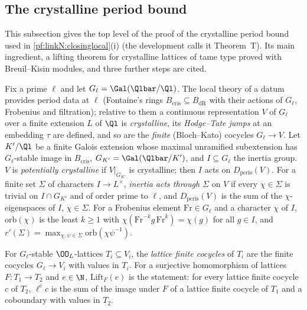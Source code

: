 \subsection{The crystalline period bound}\label{sec:pf:linkN:thmT}

This subsection gives the top level of the proof of the crystalline period bound used in \cref{pf:linkN:closinglocal}(i) (the
development calls it Theorem~T). Its main ingredient, a lifting theorem for crystalline lattices of tame type proved with
Breuil--Kisin modules, and three further steps are cited.

\begin{definition}[Setting]\label{pf:linkN:Tsetting}
Fix a prime $\ell$ and let $G_\ell=\Gal(\Qlbar/\Ql)$. The local theory of a datum provides period data at $\ell$ (Fontaine's rings
$B_{\mathrm{cris}}\subseteq B_{\mathrm{dR}}$ with their actions of $G_\ell$, Frobenius and filtration); relative to them a continuous
representation $V$ of $G_\ell$ over a finite extension $L$ of $\Ql$ is \emph{crystalline}, its \emph{Hodge--Tate jumps} at an embedding $\tau$ are
defined, and so are the \emph{finite} (Bloch--Kato) cocycles $G_\ell\to V$. Let $K'/\Ql$ be a finite Galois extension whose maximal unramified
subextension has $G_\ell$-stable image in $B_{\mathrm{cris}}$, $G_{K'}=\Gal(\Qlbar/K')$, and $I\subseteq G_\ell$ the inertia group. $V$ is
\emph{potentially crystalline} if $V|_{G_{K'}}$ is crystalline; then $I$ acts on $D_{\mathrm{pcris}}(V)$. For a finite set $\Sigma$ of characters
$I\to L^\times$, \emph{inertia acts through $\Sigma$} on $V$ if every $\chi\in\Sigma$ is trivial on $I\cap G_{K'}$ and of order prime to $\ell$, and
$D_{\mathrm{pcris}}(V)$ is the sum of the $\chi$-eigenspaces of $I$, $\chi\in\Sigma$. For a Frobenius element $\mathrm{Fr}\in G_\ell$ and a character
$\chi$ of $I$, $\mathrm{orb}(\chi)$ is the least $k\ge1$ with $\chi(\mathrm{Fr}^{-k}g\,\mathrm{Fr}^k)=\chi(g)$ for all $g\in I$, and
$r'(\Sigma)=\max_{\chi,\psi\in\Sigma}\mathrm{orb}(\chi\psi^{-1})$.

For $G_\ell$-stable $\OO_L$-lattices $T_i\subseteq V_i$, the \emph{lattice finite cocycles} of $T_i$ are the finite cocycles $G_\ell\to V_i$ with
values in $T_i$. For a surjective homomorphism of lattices $F:T_1\to T_2$ and $e\in\N$, $\mathrm{Lift}_F(e)$ is the statement: for every lattice
finite cocycle $c$ of $T_2$, $\ell^ec$ is the sum of the image under $F$ of a lattice finite cocycle of $T_1$ and a coboundary with values in
$T_2$.
\end{definition}

